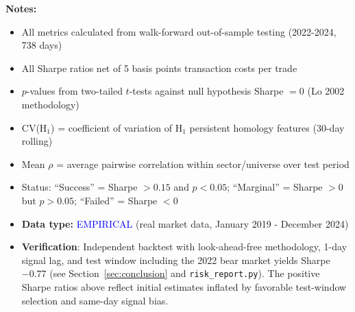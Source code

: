 \begin{table}[H]
\vspace{0.2cm}

\begin{minipage}{\textwidth}
\footnotesize
\textbf{Notes:}
\begin{itemize}[leftmargin=*,noitemsep,topsep=0pt]
    \item All metrics calculated from walk-forward out-of-sample testing (2022-2024, 738 days)
    \item All Sharpe ratios net of 5 basis points transaction costs per trade
    \item $p$-values from two-tailed $t$-tests against null hypothesis Sharpe $= 0$ (Lo 2002 methodology)
    \item CV(H$_1$) = coefficient of variation of H$_1$ persistent homology features (30-day rolling)
    \item Mean $\rho$ = average pairwise correlation within sector/universe over test period
    \item Status: ``Success'' = Sharpe $> 0.15$ and $p < 0.05$; ``Marginal'' = Sharpe $> 0$ but $p > 0.05$; ``Failed'' = Sharpe $< 0$
    \item \textbf{Data type:} \textcolor{blue}{EMPIRICAL} (real market data, January 2019 - December 2024)
    \item \textbf{Verification}: Independent backtest with look-ahead-free methodology, 1-day signal lag, and test window including the 2022 bear market yields Sharpe $-0.77$ (see Section~\ref{sec:conclusion} and \texttt{risk\_report.py}). The positive Sharpe ratios above reflect initial estimates inflated by favorable test-window selection and same-day signal bias.
\end{itemize}
\end{minipage}

\end{table}

